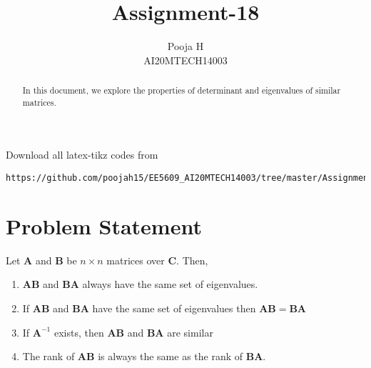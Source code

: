 \documentclass[journal,12pt,twocolumn]{IEEEtran}
\begin{document}
	\makeatother
	\let\StandardTheFigure\thefigure
	\let\vec\mathbf
	\renewcommand{\thefigure}{\theproblem}
	\def\putbox#1#2#3{\makebox[0in][l]{\makebox[#1][l]{}\raisebox{\baselineskip}[0in][0in]{\raisebox{#2}[0in][0in]{#3}}}}
	\def\rightbox#1{\makebox[0in][r]{#1}}
	\def\centbox#1{\makebox[0in]{#1}}
	\def\topbox#1{\raisebox{-\baselineskip}[0in][0in]{#1}}
	\def\midbox#1{\raisebox{-0.5\baselineskip}[0in][0in]{#1}}
	\vspace{3cm}
	\title{Assignment-18}
	\author{Pooja H \\ AI20MTECH14003}
	\maketitle
	\newpage
	\bigskip
	\renewcommand{\thefigure}{\theenumi}
	\renewcommand{\thetable}{\theenumi}
	\begin{abstract}
		In this document, we explore the properties of determinant and eigenvalues of similar matrices.
	\end{abstract}
	Download all latex-tikz codes from 
\begin{lstlisting}
https://github.com/poojah15/EE5609_AI20MTECH14003/tree/master/Assignment_18
\end{lstlisting}
	\section{Problem Statement}

Let $\vec{A}$ and $\vec{B}$ be $n \times n$ matrices over $\vec{C}$. Then,
\begin{enumerate}
	\item $\vec{AB}$ and $\vec{BA}$ always have the same set of eigenvalues.
	\item If $\vec{AB}$ and $\vec{BA}$ have the same set of eigenvalues then $\vec{AB=BA}$
	\item If $\vec{A}^{-1}$ exists, then $\vec{AB}$ and $\vec{BA}$ are similar
	\item The rank of $\vec{AB}$  is always the same as the rank of $\vec{BA}$.
\end{enumerate}
\end{document}
